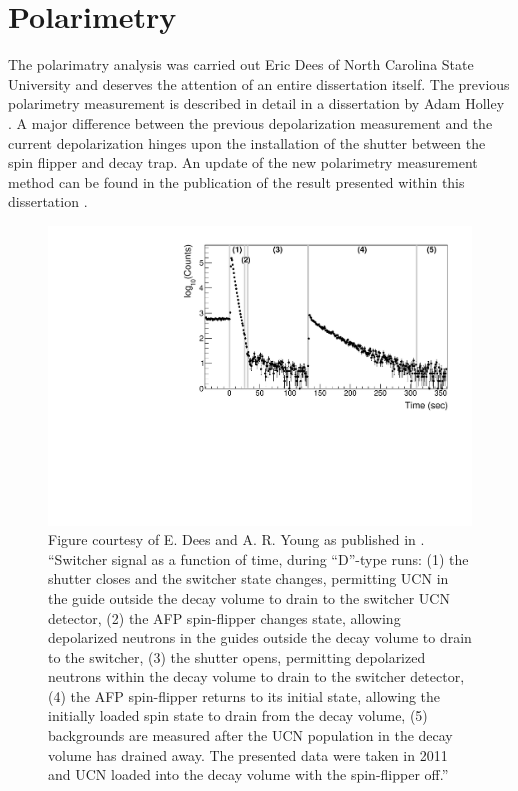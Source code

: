 \section{Polarimetry} \label{sec:polarimetry}

The polarimatry analysis was carried out Eric Dees of North Carolina State University and
deserves the attention of an entire dissertation itself. The previous polarimetry measurement
is described in detail in a dissertation by Adam Holley \cite{holley2012ultracold}. A major
difference between the previous depolarization measurement and the current depolarization
hinges upon the installation of the shutter between the spin flipper and decay trap. An
update of the new polarimetry measurement method can be found in the publication of the result
presented within this dissertation \cite{brown2017}.

\begin{figure}[h] 
\centering
\includegraphics[scale=.55]{3-UCNAAnalysis/Switcher_signals.pdf}
\caption{Figure courtesy of E. Dees and A. R. Young as published in \cite{brown2017}.
  ``Switcher signal as a function of time, during ``D''-type runs: (1) the shutter
  closes and the switcher state changes, permitting UCN in the
  guide outside the decay volume to drain to the switcher UCN detector, (2) the AFP
  spin-flipper changes state, allowing depolarized neutrons in the guides outside the
  decay volume to drain to the switcher, (3) the shutter opens, permitting depolarized
  neutrons within the decay volume to drain to the switcher detector, (4) the AFP
  spin-flipper returns to its initial state, allowing the initially loaded spin state
  to drain from the decay volume, (5) backgrounds are measured after the UCN
  population in the decay volume has drained away.  The presented data were taken in 2011
  and UCN loaded into the decay volume with the spin-flipper off.''}
\label{fig:switcherSignal}
\end{figure}

